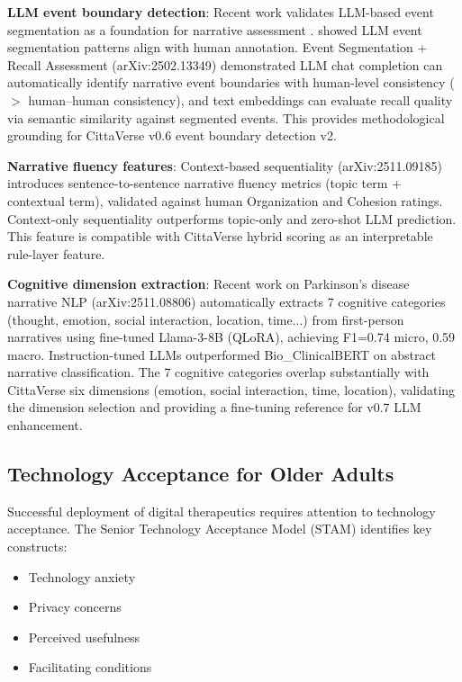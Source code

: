 \documentclass[11pt]{article}
\begin{document}
\textbf{LLM event boundary detection}: Recent work validates LLM-based event segmentation as a foundation for narrative assessment \citep{llm_narrative_seg2023,llm_event_seg2025}. \citet{llm_narrative_seg2023} showed LLM event segmentation patterns align with human annotation. Event Segmentation + Recall Assessment \citep{llm_event_seg2025} (arXiv:2502.13349) demonstrated LLM chat completion can automatically identify narrative event boundaries with human-level consistency ($>$ human--human consistency), and text embeddings can evaluate recall quality via semantic similarity against segmented events. This provides methodological grounding for CittaVerse v0.6 event boundary detection v2.

\textbf{Narrative fluency features}: Context-based sequentiality \citep{sequentiality2025} (arXiv:2511.09185) introduces sentence-to-sentence narrative fluency metrics (topic term + contextual term), validated against human Organization and Cohesion ratings. Context-only sequentiality outperforms topic-only and zero-shot LLM prediction. This feature is compatible with CittaVerse hybrid scoring as an interpretable rule-layer feature.

\textbf{Cognitive dimension extraction}: Recent work on Parkinson's disease narrative NLP \citep{pd_narrative_nlp2025} (arXiv:2511.08806) automatically extracts 7 cognitive categories (thought, emotion, social interaction, location, time...) from first-person narratives using fine-tuned Llama-3-8B (QLoRA), achieving F1=0.74 micro, 0.59 macro. Instruction-tuned LLMs outperformed Bio\_ClinicalBERT on abstract narrative classification. The 7 cognitive categories overlap substantially with CittaVerse six dimensions (emotion, social interaction, time, location), validating the dimension selection and providing a fine-tuning reference for v0.7 LLM enhancement.

\subsection{Technology Acceptance for Older Adults}

Successful deployment of digital therapeutics requires attention to technology acceptance. The Senior Technology Acceptance Model (STAM) \citep{mitzner2024} identifies key constructs:
\begin{itemize}
    \item Technology anxiety
    \item Privacy concerns
    \item Perceived usefulness
    \item Facilitating conditions
\end{itemize}
\end{document}
